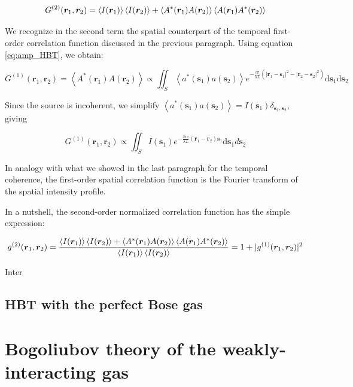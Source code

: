 \begin{equation}
     G^{(2)} (\bm{r}_1,\bm{r}_2) = \left\langle I(\bm{r}_1)\right\rangle \left\langle I(\bm{r}_2)\right\rangle + \left\langle A^*(\bm{r}_1) A(\bm{r}_2)\right\rangle \left\langle A(\bm{r}_1) A^*(\bm{r}_2)\right\rangle
\end{equation}

We recognize in the second term the spatial counterpart of the temporal first-order correlation function discussed in the previous paragraph. Using equation \ref{eq:amp_HBT}, we obtain:

\begin{equation}
    G^{(1)}\left(\bm{r}_{1}, \bm{r}_{2}\right)=\left\langle A^*(\bm{r}_1) A(\bm{r}_2)\right\rangle \propto \iint_{S}\left\langle a^{*}(\bm{s}_1) a(\bm{s}_2)\right\rangle e^{-\frac{i \pi}{\lambda L}\left(\left|\bm{r}_{1}-\bm{s}_1\right|^{2}-\left|\bm{r}_{2}-\bm{s}_2\right|^{2}\right)} \mathrm{d} \bm{s}_1 \mathrm{d} \bm{s}_2
\end{equation}

Since the source is incoherent, we simplify $\left\langle a^{*}(\bm{s}_1) a(\bm{s}_2)\right\rangle = I(\bm{s}_1) \delta_{\bm{s}_1,\bm{s}_2}$, giving

\begin{equation}
    G^{(1)}\left(\bm{r}_{1}, \bm{r}_{2}\right) \propto \iint_{S} I(\bm{s}_1) e^{-\frac{2 i \pi}{\lambda L}\left(\bm{r}_{1}-\bm{r}_{2}\right) \bm{s}_1} \mathrm{d} \bm{s}_1 d \bm{s}_2
\end{equation}

In analogy with what we showed in the last paragraph for the temporal coherence, the first-order spatial correlation function is the Fourier transform of the spatial intensity profile. 

In a nutshell, the second-order normalized correlation function has the simple expression:

\begin{equation}
    g^{(2)} (\bm{r}_1,\bm{r}_2) = \frac{\left\langle I(\bm{r}_1)\right\rangle \left\langle I(\bm{r}_2)\right\rangle + \left\langle A^*(\bm{r}_1) A(\bm{r}_2)\right\rangle \left\langle A(\bm{r}_1) A^*(\bm{r}_2)\right\rangle}{\left\langle I(\bm{r}_1)\right\rangle\left\langle I(\bm{r}_2)\right\rangle} = 1 + |g^{(1)}(\bm{r}_1,\bm{r}_2)|^2
\end{equation}

Inter


\subsection{HBT with the perfect Bose gas}

\section{Bogoliubov theory of the weakly-interacting gas}

